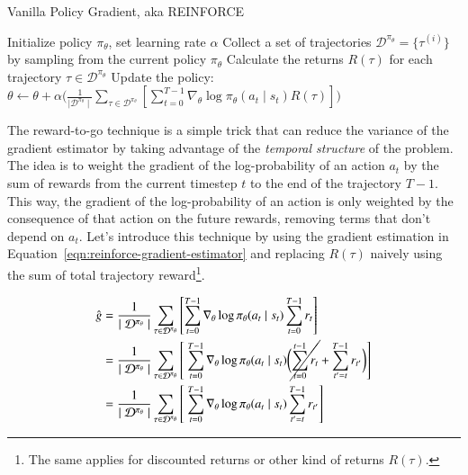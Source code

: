 \begin{algorithm}
    \caption{Vanilla Policy Gradient, aka REINFORCE}
    \begin{algorithmic}
    \STATE Initialize policy $\pi_{\theta}$, set learning rate $\alpha$
        \STATE Collect a set of trajectories $\mathcal{D}^{\pi_{\theta}}=\{\tau^{(i)}\}$ by sampling from the current policy $\pi_{\theta}$
        \STATE Calculate the returns $R(\tau)$ for each trajectory $\tau\in\mathcal{D^{\pi_{\theta}}}$
        \STATE Update the policy: $\theta \leftarrow \theta + \alpha \bigg(\frac{1}{\mid\mathcal{D^{\pi_{\theta}}}\mid}\sum_{\tau\in\mathcal{D}^{\pi_{\theta}}}\left[\sum_{t=0}^{T-1}\nabla_{\theta}\log\pi_{\theta}(a_{t}\mid s_{t})R(\tau)\right]\bigg)$
    \ENDFOR
    \end{algorithmic}
\end{algorithm}

\noindent The reward-to-go technique is a simple trick that can reduce the variance of the gradient estimator by taking advantage of the \textit{temporal structure} of the problem. The idea is to weight the gradient of the log-probability of an action $a_{t}$ by the sum of rewards from the current timestep $t$ to the end of the trajectory $T-1$. This way, the gradient of the log-probability of an action is only weighted by the consequence of that action on the future rewards, removing terms that don't depend on $a_{t}$. Let's introduce this technique by using the gradient estimation in Equation~\ref{eqn:reinforce-gradient-estimator} and replacing $R(\tau)$ naively using the sum of total trajectory reward\footnote{The same applies for discounted returns or other kind of returns $R(\tau)$.}.

\begin{equation}\label{eqn:reinforce-gradient-reward-to-go}
    \begin{split}
        \hat{g} &= \frac{1}{\mid\mathcal{D}^{\pi_{\theta}}\mid}\sum_{\tau\in\mathcal{D}^{\pi_{\theta}}}\left[\sum_{t=0}^{T-1} \nabla_{\theta} \log\pi_{\theta} (a_{t}\mid s_{t})\sum_{t=0}^{T-1} r_{t}\right] \\
        &= \frac{1}{\mid\mathcal{D}^{\pi_{\theta}}\mid}\sum_{\tau\in\mathcal{D}^{\pi_{\theta}}}\left[~\sum_{t=0}^{T-1} \nabla_{\theta} \log\pi_{\theta} (a_{t}\mid s_{t}) \bigg( \cancel{\sum_{t=0}^{t-1} r_{t}}  + \sum_{t'=t}^{T-1} r_{t'} \bigg)\right] \\
        &= \frac{1}{\mid\mathcal{D}^{\pi_{\theta}}\mid}\sum_{\tau\in\mathcal{D}^{\pi_{\theta}}}\left[~\sum_{t=0}^{T-1} \nabla_{\theta} \log\pi_{\theta} (a_{t}\mid s_{t}) \sum_{t'=t}^{T-1} r_{t'}\right] 
    \end{split}
\end{equation}

